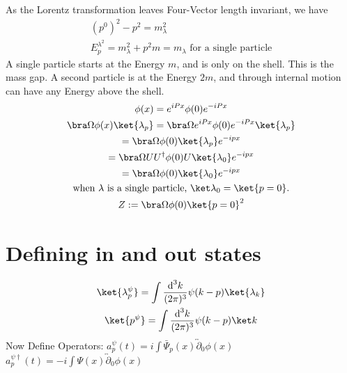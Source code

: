 \documentclass[]{scrartcl}
\begin{document}
As the Lorentz transformation leaves Four-Vector length invariant, we have\\
\begin{gather}
	 (p^0)^2 - p^2 = m_\lambda^2\\
	 E_p^{\lambda^2} = m_\lambda^2 + p^2
	 m = m_\lambda\text{ for a single particle}
\end{gather}
A single particle starts at the Energy $m$, and is only on the shell. This is the mass gap. A second particle is at the Energy $2m$, and through internal motion can have any Energy above the shell.
\begin{gather}
	\phi(x) = e^{iPx}\phi(0) e^{-iPx}\\
	\bra\Omega \phi(x) \ket{\lambda_p} = \bra\Omega e^{iPx}\phi(0)e^{-iPx}\ket{\lambda_p}\\
	= \bra\Omega \phi(0) \ket{\lambda_p}e^{-ipx}\\
	= \bra\Omega UU^\dagger \phi(0) U \ket{\lambda_0}e^{-ipx}\\
	= \bra\Omega \phi(0) \ket{\lambda_0} e^{-ipx}\\
	\text{when $\lambda$ is a single particle, $\ket\lambda_0 = \ket{p=0}$.}\nonumber\\
	Z := \bra\Omega\phi(0)\ket{p=0}^2
\end{gather}

\section{Defining in and out states}
\begin{gather}
	\ket{\lambda_p^\psi} = \int \frac{\text d^3k}{(2\pi)^3}\psi(k-p)\ket{\lambda_k}\\
	\ket{p^\psi} = \int \frac{\text d^3k}{(2\pi)^3}\psi(k-p) \ket k
\end{gather}
Now Define Operators: $a_p^\psi(t) = i\int \bar\Psi_p(x) \overleftrightarrow\partial_0 \phi(x)$\\
$a_p^{\psi\dagger}(t) = -i\int \Psi(x) \overleftrightarrow\partial_0 \phi(x)$
\end{document}
